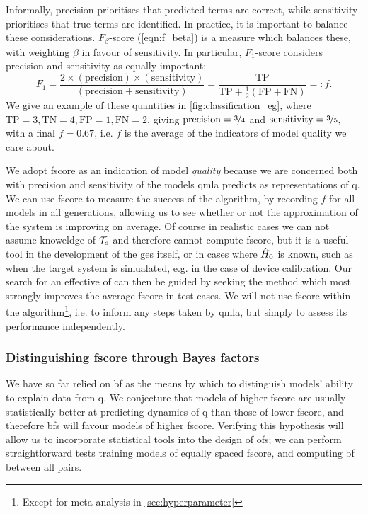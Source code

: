 Informally, precision prioritises that predicted terms are correct, 
    while sensitivity prioritises that true terms are identified. 
In practice, it is important to balance these considerations. 
$F_{\beta}$-score (\cref{eqn:f_beta}) is a measure which balances these,
    with weighting $\beta$ in favour of sensitivity.
In particular, $F_1$-score considers precision and sensitivity as equally important:
\begin{equation}
    \label{eqn:f1_score}
    F_1 = \frac{
        2\times (\textrm{precision})\times(\textrm{sensitivity})
    }{
        (\textrm{precision} + \textrm{sensitivity})
    } = \frac{\textrm{TP}}{\textrm{TP} + \frac{1}{2}(\textrm{FP} + \textrm{FN})} =: f.
\end{equation}
We give an example of these quantities in \cref{fig:classification_eg}, 
    where $\textrm{TP}=3, \textrm{TN}=4, \textrm{FP}=1, \textrm{FN}=2$, giving $\textrm{precision} = \nicefrac{3}{4}$ 
    and $\textrm{sensitivity} = \nicefrac{3}{5}$, 
    with a final $f = 0.67$, i.e. $f$ is the average of the indicators of model quality we care about. 
\par 

We adopt \gls{fscore} as an indication of model \emph{quality} because we are concerned both with precision and sensitivity
    of the models \gls{qmla} predicts as representations of \gls{q}. 
We can use \gls{fscore} to measure the success of the algorithm,
    by recording $f$ for all models in all generations, allowing us to 
    see whether or not the approximation of the system is improving on average. 
Of course in realistic cases we can not assume knoweldge of $\mathcal{T}_o$ and therefore cannot compute 
    \gls{fscore}, but it is a useful tool in the development of the \gls{ges} itself, 
    or in cases where $\hat{H}_0$ is known, such as when the target system is simualated, e.g. in the case of device calibration.
Our search for an effective \gls{of} can then be guided by seeking the 
    method which most strongly improves the average \gls{fscore} in test-cases.
We will not use \gls{fscore} within the algorithm\footnote{Except for meta-analysis in \cref{sec:hyperparameter}}, 
    i.e. to inform any steps taken by \gls{qmla}, but simply to assess its performance independently.


\newpage
\subsubsection{Distinguishing \gls{fscore} through Bayes factors}\label{sec:bf_by_f_score}
We have so far relied on \gls{bf} as the means by which to distinguish models' 
    ability to explain data from \gls{q}. 
We conjecture that models of higher \gls{fscore} are usually statistically better at predicting dynamics of \gls{q}
    than those of lower \gls{fscore}, and therefore \glspl{bf} will favour models of higher \gls{fscore}.
Verifying this hypothesis will allow us to incorporate statistical tools into the design of \glspl{of};
    we can perform straightforward tests training models of equally spaced \gls{fscore}, and computing \acrshort{bf} between all pairs.
\par 

